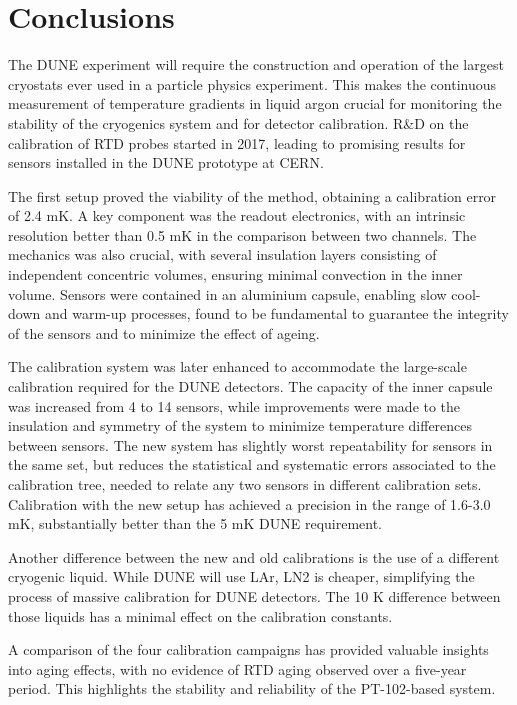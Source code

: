 \section{Conclusions}
\label{conclusions}

\noindent The DUNE experiment will require the construction and operation of the largest cryostats ever used in a particle physics experiment. This makes the continuous measurement of temperature gradients in liquid argon crucial for monitoring the stability of the cryogenics system and for detector calibration. R\&D on the calibration of RTD probes started in 2017, leading to promising results for sensors installed in the DUNE prototype at CERN.

The first setup proved the viability of the method, obtaining a calibration error of 2.4 mK. A key component was the readout electronics, with an intrinsic resolution better than 0.5 mK in the comparison between two channels. The mechanics was also crucial, with several insulation layers consisting of independent concentric volumes, ensuring minimal convection in the inner volume. Sensors were contained in an aluminium capsule, enabling slow cool-down and warm-up processes, found to be fundamental to guarantee the integrity of the sensors and to minimize the effect of ageing.

The calibration system was later enhanced to accommodate the large-scale calibration required for the DUNE detectors. The capacity of the inner capsule was increased from 4 to 14 sensors, while improvements were made to the insulation and symmetry of the system to minimize temperature differences between sensors. The new system has slightly worst repeatability for sensors in the same set, but reduces the statistical and systematic errors associated to the calibration tree, needed to relate any two sensors in different calibration sets. Calibration with the new setup has achieved a precision in the range of 1.6-3.0 mK, substantially better than the 5 mK DUNE requirement.

Another difference between the new and old calibrations is the use of a different cryogenic liquid. While DUNE will use LAr, LN2 is cheaper, simplifying the process of massive calibration for DUNE detectors. The 10 K difference between those liquids has a minimal effect on the calibration constants.

A comparison of the four calibration campaigns has provided valuable insights into aging effects, with no evidence of RTD aging observed over a five-year period. This highlights the stability and reliability of the PT-102-based system.